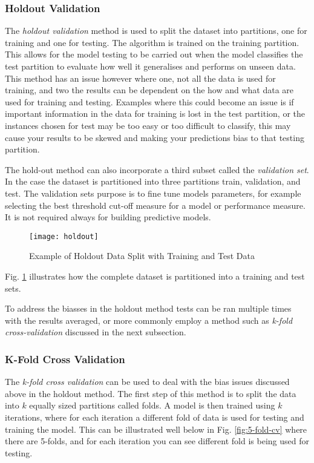 \subsubsection{Holdout Validation}
The \textit{holdout validation} method is used to split the dataset into partitions, one for training and one for testing. The algorithm is trained on the training partition. This allows for the model testing to be carried out when the model classifies the test partition to evaluate how well it generalises and performs on unseen data. This method has an issue however where one, not all the data is used for training, and two the results can be dependent on the how and what data are used for training and testing. Examples where this could become an issue is if important information in the data for training is lost in the test partition, or the instances chosen for test may be too easy or too difficult to classify, this may cause your results to be skewed and making your predictions bias to that testing partition. 

The hold-out method can also incorporate a third subset called the \textit{validation set}. In the case the dataset is partitioned into three partitions train, validation, and test. The validation sets purpose is to fine tune models parameters, for example selecting the best threshold cut-off measure for a model or performance measure. It is not required always for building predictive models. 

\begin{figure}[H]
	\texttt{[image: holdout]}
	\caption{Example of Holdout Data Split with Training and Test Data}
	\label{fig:holdout}
\end{figure}

Fig. \ref{fig:holdout} illustrates how the complete dataset is partitioned into a training and test sets. 




To address the biasses in the holdout method tests can be ran multiple times with the results averaged, or more commonly employ a method such as \textit{k-fold cross-validation} discussed in the next subsection.

\subsubsection{K-Fold Cross Validation}\label{subsec:k_fold}
The \textit{k-fold cross validation} can be used to deal with the bias issues discussed above in the holdout method. The first step of this method is to split the data into $k$ equally sized partitions called folds. A model is then trained using $k$ iterations, where for each iteration a different fold of data is used for testing and training the model. This can be illustrated well below in Fig. \ref{fig:5-fold-cv} where there are 5-folds, and for each iteration you can see different fold is being used for testing.  


